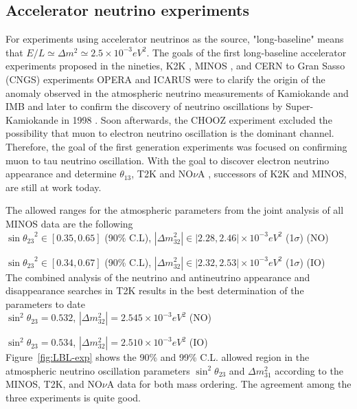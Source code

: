 \documentclass[english]{article}
\begin{document}
\subsection{Accelerator neutrino experiments}

	For experiments using accelerator neutrinos as the source, "long-baseline"
means that $E/L \simeq \Delta{m^{2}} \simeq 2.5 \times 10^{-3} eV^{2}$. The goals of the first long-baseline accelerator experiments proposed in the nineties, K2K \cite{k2k}, MINOS \cite{minos}, and CERN to Gran Sasso (CNGS) experiments OPERA \cite{opera} and ICARUS \cite{icarus} were to clarify the origin of the anomaly observed in the atmospheric neutrino measurements of Kamiokande \cite{kamiokande} and IMB \cite{imb} and later to confirm the discovery of neutrino oscillations by Super-Kamiokande in 1998 \cite{superk}. Soon afterwards, the CHOOZ experiment \cite{chooz} excluded the possibility that muon to electron neutrino oscillation is the dominant channel. Therefore, the goal of the first generation experiments was focused on confirming muon to tau neutrino oscillation. With the goal to discover electron neutrino appearance and determine $\theta_{13}$, T2K \cite{t2k} and NO$\nu$A \cite{nova}, successors of K2K and MINOS, are still at work today.
	
    The allowed ranges for the atmospheric parameters from the joint analysis of all MINOS data \cite{minosdata} are the following\\
    
    $\sin{\theta_{23}}^{2} \in [0.35, 0.65]$ (90\% C.L), $|\Delta{m_{32}^{2}}| \in |2.28, 2.46| \times 10^{-3} eV^{2}$ (1$\sigma$) (NO)
    
    $\sin{\theta_{23}}^{2} \in [0.34, 0.67]$ (90\% C.L), $|\Delta{m_{32}^{2}}| \in |2.32, 2.53| \times 10^{-3} eV^{2}$ (1$\sigma$) (IO)\\
    
   The combined analysis of the neutrino and antineutrino appearance and disappearance searches in T2K results in the best determination of the parameters to date \cite{t2kdata}\\
   
   $\sin^{2}{\theta_{23}} = 0.532$, $|\Delta{m_{32}^{2}}| = 2.545 \times 10^{-3} eV^{2}$ (NO)
    
    $\sin^{2}{\theta_{23}} = 0.534$, $|\Delta{m_{32}^{2}}| = 2.510 \times 10^{-3} eV^{2}$ (IO)\\
    
    Figure~\ref{fig:LBL-exp} shows the 90\% and 99\% C.L. allowed region in the atmospheric neutrino oscillation parameters $\sin^{2}{\theta_{23}}$ and $\Delta{m^{2}_{31}}$ according to the MINOS, T2K, and NO$\nu$A data for both mass ordering. The agreement among the three experiments is quite good.
    
\end{document}
